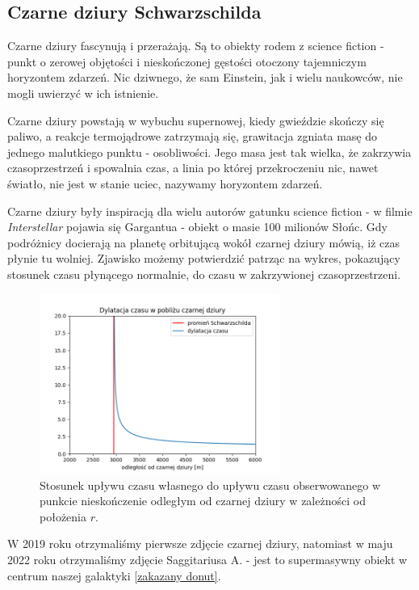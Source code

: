 \subsection{Czarne dziury Schwarzschilda}

Czarne dziury fascynują i przerażają. Są to obiekty rodem z science fiction - punkt o zerowej objętości i nieskończonej gęstości otoczony tajemniczym horyzontem zdarzeń. Nic dziwnego, że sam Einstein, jak i wielu naukowców, nie mogli uwierzyć w ich istnienie.

Czarne dziury powstają w wybuchu supernowej, kiedy gwieździe skończy się paliwo, a reakcje termojądrowe zatrzymają się, grawitacja zgniata masę do jednego malutkiego punktu - osobliwości. Jego masa jest tak wielka, że zakrzywia czasoprzestrzeń i spowalnia czas, a linia po której przekroczeniu nic, nawet światło, nie jest w stanie uciec, nazywamy horyzontem zdarzeń. 

Czarne dziury były inspiracją dla wielu autorów gatunku science fiction - w filmie \emph{Interstellar} pojawia się Gargantua - obiekt o masie 100 milionów Słońc. Gdy podróżnicy docierają na planetę orbitującą wokół czarnej dziury mówią, iż czas płynie tu wolniej. Zjawisko możemy potwierdzić patrząc na wykres, pokazujący stosunek czasu płynącego normalnie, do czasu w zakrzywionej czasoprzestrzeni.

\renewcommand{\figurename}{Wykres}
\begin{figure}[h]
  \centering
  \includegraphics[width=0.7\textwidth]{ilustracje/Time_near_black_hole.png}
  \caption{Stosunek upływu czasu własnego do upływu czasu obserwowanego w punkcie nieskończenie odległym od czarnej dziury w zależności od położenia $r$.}
\end{figure}

W 2019 roku otrzymaliśmy pierwsze zdjęcie czarnej dziury, natomiast w maju 2022 roku otrzymaliśmy zdjęcie Saggitariusa A. - jest to supermasywny obiekt w centrum naszej galaktyki \ref{zakazany donut}.

